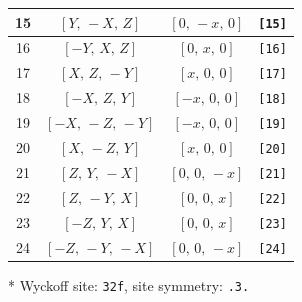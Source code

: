 \documentclass[fleqn,8pt]{jsarticle}
\begin{document}
\begin{longtable}{cccc}
15 & $\left[ Y,\, - X,\, Z \right]$ & $\left[ 0,\, - x,\, 0 \right]$ & {\tt [15]} \\ \hline
16 & $\left[ - Y,\, X,\, Z \right]$ & $\left[ 0,\, x,\, 0 \right]$ & {\tt [16]} \\ \hline
17 & $\left[ X,\, Z,\, - Y \right]$ & $\left[ x,\, 0,\, 0 \right]$ & {\tt [17]} \\ \hline
18 & $\left[ - X,\, Z,\, Y \right]$ & $\left[ - x,\, 0,\, 0 \right]$ & {\tt [18]} \\ \hline
19 & $\left[ - X,\, - Z,\, - Y \right]$ & $\left[ - x,\, 0,\, 0 \right]$ & {\tt [19]} \\ \hline
20 & $\left[ X,\, - Z,\, Y \right]$ & $\left[ x,\, 0,\, 0 \right]$ & {\tt [20]} \\ \hline
21 & $\left[ Z,\, Y,\, - X \right]$ & $\left[ 0,\, 0,\, - x \right]$ & {\tt [21]} \\ \hline
22 & $\left[ Z,\, - Y,\, X \right]$ & $\left[ 0,\, 0,\, x \right]$ & {\tt [22]} \\ \hline
23 & $\left[ - Z,\, Y,\, X \right]$ & $\left[ 0,\, 0,\, x \right]$ & {\tt [23]} \\ \hline
24 & $\left[ - Z,\, - Y,\, - X \right]$ & $\left[ 0,\, 0,\, - x \right]$ & {\tt [24]} \\
\end{longtable}
* Wyckoff site: {\tt 32f}, site symmetry: {\tt .3.}
\renewcommand{\arraystretch}{1.2}
\end{document}
